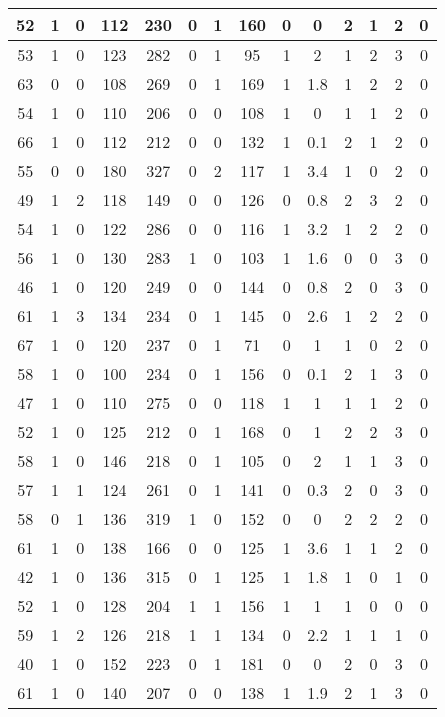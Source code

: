 \documentclass{article}
\begin{document}
\begin{longtable}{|c|c|c|c|c|c|c|c|c|c|c|c|c|c|}
\hline
52 & 1 & 0 & 112 & 230 & 0 & 1 & 160 & 0 & 0 & 2 & 1 & 2 & 0\\
\hline
53 & 1 & 0 & 123 & 282 & 0 & 1 & 95 & 1 & 2 & 1 & 2 & 3 & 0\\
\hline
63 & 0 & 0 & 108 & 269 & 0 & 1 & 169 & 1 & 1.8 & 1 & 2 & 2 & 0\\
\hline
54 & 1 & 0 & 110 & 206 & 0 & 0 & 108 & 1 & 0 & 1 & 1 & 2 & 0\\
\hline
66 & 1 & 0 & 112 & 212 & 0 & 0 & 132 & 1 & 0.1 & 2 & 1 & 2 & 0\\
\hline
55 & 0 & 0 & 180 & 327 & 0 & 2 & 117 & 1 & 3.4 & 1 & 0 & 2 & 0\\
\hline
49 & 1 & 2 & 118 & 149 & 0 & 0 & 126 & 0 & 0.8 & 2 & 3 & 2 & 0\\
\hline
54 & 1 & 0 & 122 & 286 & 0 & 0 & 116 & 1 & 3.2 & 1 & 2 & 2 & 0\\
\hline
56 & 1 & 0 & 130 & 283 & 1 & 0 & 103 & 1 & 1.6 & 0 & 0 & 3 & 0\\
\hline
46 & 1 & 0 & 120 & 249 & 0 & 0 & 144 & 0 & 0.8 & 2 & 0 & 3 & 0\\
\hline
61 & 1 & 3 & 134 & 234 & 0 & 1 & 145 & 0 & 2.6 & 1 & 2 & 2 & 0\\
\hline
67 & 1 & 0 & 120 & 237 & 0 & 1 & 71 & 0 & 1 & 1 & 0 & 2 & 0\\
\hline
58 & 1 & 0 & 100 & 234 & 0 & 1 & 156 & 0 & 0.1 & 2 & 1 & 3 & 0\\
\hline
47 & 1 & 0 & 110 & 275 & 0 & 0 & 118 & 1 & 1 & 1 & 1 & 2 & 0\\
\hline
52 & 1 & 0 & 125 & 212 & 0 & 1 & 168 & 0 & 1 & 2 & 2 & 3 & 0\\
\hline
58 & 1 & 0 & 146 & 218 & 0 & 1 & 105 & 0 & 2 & 1 & 1 & 3 & 0\\
\hline
57 & 1 & 1 & 124 & 261 & 0 & 1 & 141 & 0 & 0.3 & 2 & 0 & 3 & 0\\
\hline
58 & 0 & 1 & 136 & 319 & 1 & 0 & 152 & 0 & 0 & 2 & 2 & 2 & 0\\
\hline
61 & 1 & 0 & 138 & 166 & 0 & 0 & 125 & 1 & 3.6 & 1 & 1 & 2 & 0\\
\hline
42 & 1 & 0 & 136 & 315 & 0 & 1 & 125 & 1 & 1.8 & 1 & 0 & 1 & 0\\
\hline
52 & 1 & 0 & 128 & 204 & 1 & 1 & 156 & 1 & 1 & 1 & 0 & 0 & 0\\
\hline
59 & 1 & 2 & 126 & 218 & 1 & 1 & 134 & 0 & 2.2 & 1 & 1 & 1 & 0\\
\hline
40 & 1 & 0 & 152 & 223 & 0 & 1 & 181 & 0 & 0 & 2 & 0 & 3 & 0\\
\hline
61 & 1 & 0 & 140 & 207 & 0 & 0 & 138 & 1 & 1.9 & 2 & 1 & 3 & 0\\

\end{longtable}
\end{document}

